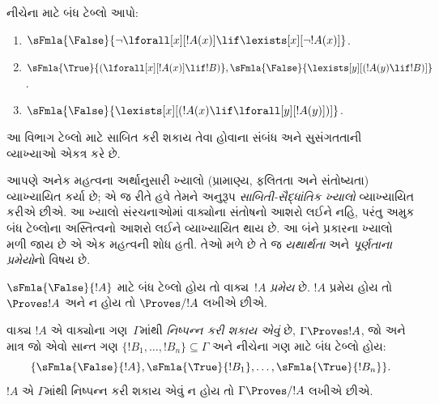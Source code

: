 \begin{prob}
નીચેના માટે બંધ ટેબ્લો આપો:
\begin{enumerate}
\item $\sFmla{\False}{\lnot\lforall[x][!A(x)] \lif \lexists[x][\lnot!A(x)]}$.
\item $\sFmla{\True}{(\lforall[x][!A(x)] \lif !B)}, \sFmla{\False}{\lexists[y][(!A(y) \lif !B)]}$.
\item $\sFmla{\False}{\lexists[x][(!A(x) \lif \lforall[y][!A(y)])]}$.
\end{enumerate}
\end{prob}
\endgroup


\begingroup
\makeatletter{}\makeatother


\label{guunit:OLP-0105}


\begin{editorial}
આ વિભાગ ટેબ્લો માટે સાબિત કરી શકાય તેવા હોવાના સંબંધ અને સુસંગતતાની
વ્યાખ્યાઓ એકત્ર કરે છે.
\end{editorial}

\begin{explain}
આપણે અનેક મહત્વના અર્થાનુસારી ખ્યાલો (પ્રામાણ્ય, ફલિતતા અને સંતોષ્યતા)
વ્યાખ્યાયિત કર્યા છે; એ જ રીતે હવે તેમને અનુરૂપ \emph{સાબિતી-સૈદ્ધાંતિક
ખ્યાલો} વ્યાખ્યાયિત કરીએ છીએ. આ ખ્યાલો સંરચનાઓમાં
વાક્યોના સંતોષનો આશરો લઈને નહિ, પરંતુ અમુક બંધ ટેબ્લોના
અસ્તિત્વનો આશરો લઈને વ્યાખ્યાયિત થાય છે. આ બંને પ્રકારના ખ્યાલો મળી જાય
છે એ એક મહત્વની શોધ હતી. તેઓ મળે છે તે જ \emph{યથાર્થતા} અને
\emph{પૂર્ણતાના પ્રમેયો}નો વિષય છે.
\end{explain}


\begin{defn}[પ્રમેયો]
$\sFmla{\False}{!A}$ માટે બંધ ટેબ્લો હોય તો વાક્ય~$!A$
\emph{પ્રમેય} છે. $!A$ પ્રમેય હોય તો $\Proves !A$ અને ન હોય તો
$\Proves/ !A$ લખીએ છીએ.
\end{defn}

\begin{defn}[નિષ્પન્નક્ષમતા]
વાક્ય $!A$ એ વાક્યોના ગણ~$\Gamma$માંથી
\emph{નિષ્પન્ન કરી શકાય એવું} છે, $\Gamma \Proves !A$, જો અને માત્ર જો એવો સાન્ત
ગણ $\{!B_1, \dots, !B_n\} \subseteq \Gamma$ અને નીચેના ગણ માટે બંધ
ટેબ્લો હોય:
\[
\{
  \sFmla{\False}{!A},
  \sFmla{\True}{!B_1}, \dots,
  \sFmla{\True}{!B_n}
  \}.
\]
$!A$ એ $\Gamma$માંથી નિષ્પન્ન કરી શકાય એવું ન હોય તો $\Gamma \Proves/ !A$
લખીએ છીએ.
\end{defn}


